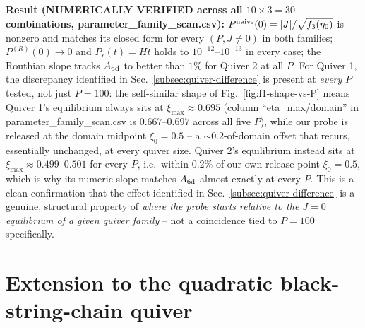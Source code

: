 \documentclass[11pt]{article}
\begin{document}
\textbf{Result (NUMERICALLY VERIFIED across all $10\times3=30$ combinations, parameter\_family\_scan.csv):} $P^{\rm naive}(0)=|J|/\sqrt{f_3(\eta_0)}$ is nonzero and matches its closed form for every $(P,J\neq0)$ in both families; $P^{(R)}(0)\to0$ and $P_r(t)=Ht$ holds to $10^{-12}$--$10^{-13}$ in every case; the Routhian slope tracks $A_{\rm 6d}$ to better than $1\%$ for Quiver 2 at all $P$. For Quiver 1, the discrepancy identified in Sec.~\ref{subsec:quiver-difference} is present at \emph{every} $P$ tested, not just $P=100$: the self-similar shape of Fig.~\ref{fig:f1-shape-vs-P} means Quiver 1's equilibrium always sits at $\xi_{\max}\approx0.695$ (column ``eta\_max/domain'' in parameter\_family\_scan.csv is $0.667$--$0.697$ across all five $P$), while our probe is released at the domain midpoint $\xi_0=0.5$ -- a $\sim0.2$-of-domain offset that recurs, essentially unchanged, at every quiver size. Quiver 2's equilibrium instead sits at $\xi_{\max}\approx0.499$--$0.501$ for every $P$, i.e.\ within $0.2\%$ of our own release point $\xi_0=0.5$, which is why its numeric slope matches $A_{\rm 6d}$ almost exactly at every $P$. This is a clean confirmation that the effect identified in Sec.~\ref{subsec:quiver-difference} is a genuine, structural property of \emph{where the probe starts relative to the $J=0$ equilibrium of a given quiver family} -- not a coincidence tied to $P=100$ specifically.

\section{Extension to the quadratic black-string-chain quiver}
\label{sec:blackstring}
\end{document}
